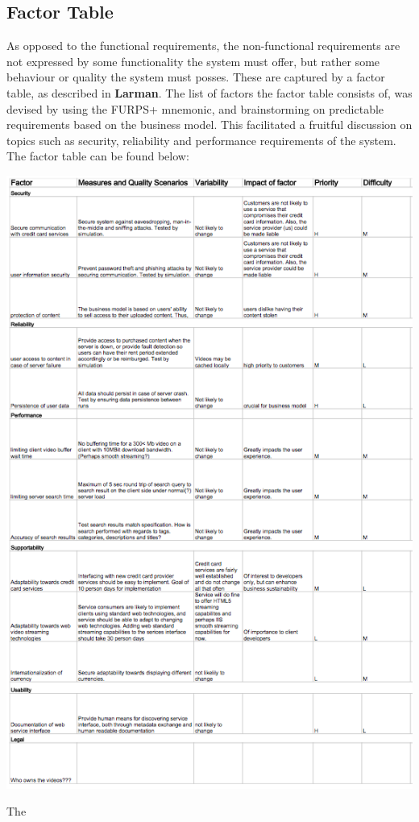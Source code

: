 \subsection{Factor Table}
As opposed to the functional requirements, the non-functional requirements are not expressed by some functionality the system must offer, but rather some behaviour or quality the system must posses. These are captured by a factor table, as described in \textbf{Larman}. The list of factors the factor table consists of, was devised by using the FURPS+ mnemonic, and brainstorming on predictable requirements based on the business model. This facilitated a fruitful discussion on topics such as security, reliability and performance requirements of the system. The factor table can be found below:
\begin{center}
\includegraphics[scale=1.3]{FactorTable.png}
\end{center}
The 

